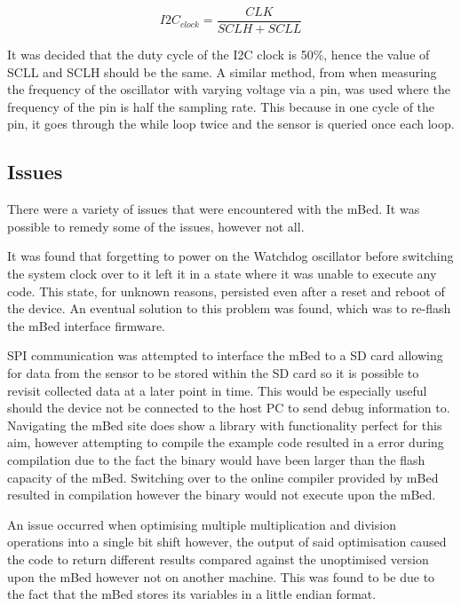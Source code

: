 \begin{equation}
	I2C_{clock} = \frac{CLK}{SCLH + SCLL}
	\label{eqn:i2c_clock}
\end{equation}

It was decided that the duty cycle of the I2C clock is 50\%, hence the value of SCLL and SCLH should be the same. A similar method, from when measuring the frequency of the oscillator with varying voltage via a pin, was used where the frequency of the pin is half the sampling rate. This because in one cycle of the pin, it goes through the while loop twice and the sensor is queried once each loop.

\subsection{Issues}

There were a variety of issues that were encountered with the mBed. It was possible to remedy some of the issues, however not all.

It was found that forgetting to power on the Watchdog oscillator before switching the system clock over to it left it in a state where it was unable to execute any code. This state, for unknown reasons, persisted even after a reset and reboot of the device. An eventual solution to this problem was found, which was to re-flash the mBed interface firmware.

SPI communication was attempted to interface the mBed to a SD card allowing for data from the sensor to be stored within the SD card so it is possible to revisit collected data at a later point in time. This would be especially useful should the device not be connected to the host PC to send debug information to. Navigating the mBed site does show a library with functionality perfect for this aim, however attempting to compile the example code resulted in a error during compilation due to the fact the binary would have been larger than the flash capacity of the mBed. Switching over to the online compiler provided by mBed resulted in compilation however the binary would not execute upon the mBed.

An issue occurred when optimising multiple multiplication and division operations into a single bit shift however, the output of said optimisation caused the code to return different results compared against the unoptimised version upon the mBed however not on another machine. This was found to be due to the fact that the mBed stores its variables in a little endian format.

